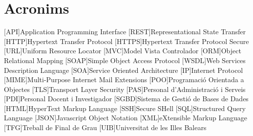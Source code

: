 \chapter{Acronims} 
\begin{acronym}

[API]{Application Programming Interface}
[REST]{Representational State Transfer}
[HTTP]{Hypertext Transfer Protocol}
[HTTPS]{Hypertext Transfer Protocol Secure}
[URL]{Uniform Resource Locator}
[MVC]{Model Vista Controlador}
[ORM]{Object Relational Mapping}
[SOAP]{Simple Object Access Protocol}
[WSDL]{Web Services Description Language}
[SOA]{Service Oriented Architecture}
[IP]{Internet Protocol}
[MIME]{Multi-Purpose Internet Mail Extensions}
[POO]{Programació Orientada a Objectes}
[TLS]{Transport Layer Security}
[PAS]{Personal d'Administració i Serveis}
[PDI]{Personal Docent i Investigador}
[SGBD]{Sistema de Gestió de Bases de Dades}
[HTML]{HyperText Markup Language}
[SSH]{Secure SHell}
[SQL]{Structured Query Language}
[JSON]{Javascript Object Notation}
[XML]{eXtensible Markup Language}
[TFG]{Treball de Final de Grau}
[UIB]{Universitat de les Illes Balears}

\end{acronym}
